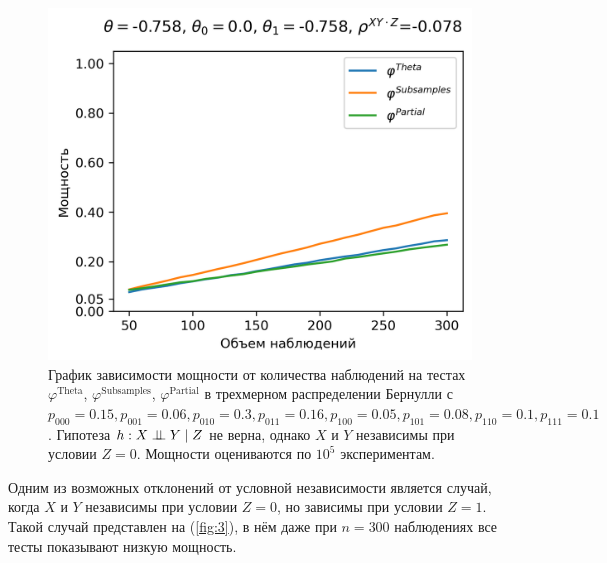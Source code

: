 \begin{figure}[H]
    \centering
    \includegraphics[scale=0.6]{images/graph3.png}
    \caption{График зависимости мощности от количества наблюдений
    на тестах $\varphi^{\text{Theta}}$, $\varphi^{\text{Subsamples}}$, $\varphi^{\text{Partial}}$
    в трехмерном распределении Бернулли с $p_{000}=0.15, p_{001}=0.06, 
    p_{010}=0.3, p_{011}=0.16,
    p_{100}=0.05, p_{101}=0.08, p_{110}=0.1, p_{111}=0.1$. 
    Гипотеза $h: X \perp\!\!\!\perp Y \mid Z$ не верна, однако $X$ и $Y$ независимы
    при условии $Z=0$. 
    Мощности оцениваются по $10^5$ экспериментам.}\label{fig:3}
\end{figure}

Одним из возможных отклонений от условной независимости является случай,
когда $X$ и $Y$ независимы при условии $Z=0$, но зависимы при условии $Z=1$.
Такой случай представлен на (\autoref{fig:3}), в нём даже при $n=300$ наблюдениях все тесты показывают
низкую мощность.

